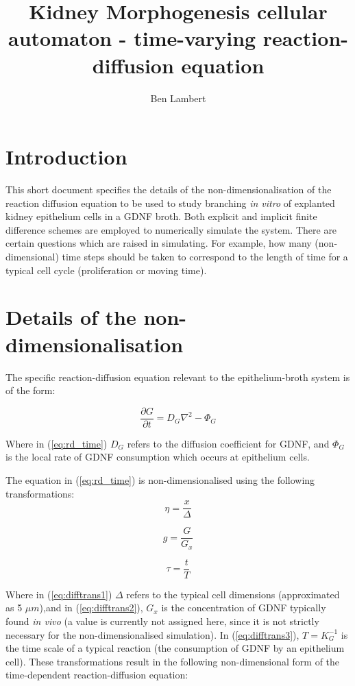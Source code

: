 \documentclass[pdftex,10pt,a4paper]{article}
\title{\textbf{Kidney Morphogenesis cellular automaton - time-varying reaction-diffusion equation}\newline }
\author{Ben Lambert}
\begin{document}
\maketitle
\doublespacing
\section{Introduction}
This short document specifies the details of the non-dimensionalisation of the reaction diffusion equation to be used to study branching \emph{in vitro} of explanted kidney epithelium cells in a GDNF broth. Both explicit and implicit finite difference schemes are employed to numerically simulate the system. There are certain questions which are raised in simulating. For example, how many (non-dimensional) time steps should be taken to correspond to the length of time for a typical cell cycle (proliferation or moving time).

\section{Details of the non-dimensionalisation}
The specific reaction-diffusion equation relevant to the epithelium-broth system is of the form:

\begin{equation}\label{eq:rd_time}
\frac{\partial G}{\partial t} = D_G \nabla^2 - \Phi_G
\end{equation}

Where in (\ref{eq:rd_time}) $D_G$ refers to the diffusion coefficient for GDNF, and $\Phi_G$ is the local rate of GDNF consumption which occurs at epithelium cells.


The equation in (\ref{eq:rd_time}) is non-dimensionalised using the following transformations:
\begin{equation}\label{eq:difftrans1}
\eta = \frac{x}{\Delta}
\end{equation}

\begin{equation}\label{eq:difftrans2}
g = \frac{G}{G_x}
\end{equation}

\begin{equation}\label{eq:difftrans3}
\tau = \frac{t}{T}
\end{equation}

Where in (\ref{eq:difftrans1}) $\Delta$ refers to the typical cell dimensions (approximated as 5 $\mu m$),and in (\ref{eq:difftrans2}), $G_x$ is the concentration of GDNF typically found \textit{in vivo} (a value is currently not assigned here, since it is not strictly necessary for the non-dimensionalised simulation). In (\ref{eq:difftrans3}), $T = K_G^{-1}$ is the time scale of a typical reaction (the consumption of GDNF by an epithelium cell). These transformations result in the following non-dimensional form of the time-dependent reaction-diffusion equation:
\end{document}
